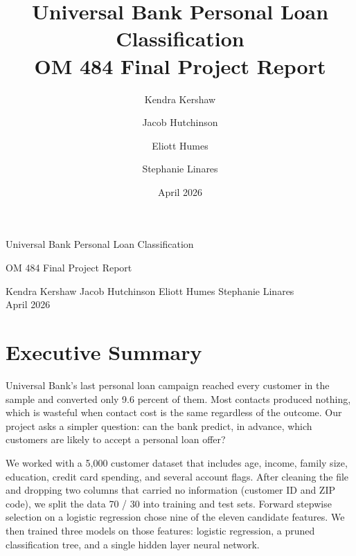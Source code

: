 \documentclass[11pt, a4paper]{article}
\title{Universal Bank Personal Loan Classification\\[0.3em]
       \large OM 484 Final Project Report}
\author{Kendra Kershaw \and Jacob Hutchinson \and Eliott Humes \and Stephanie Linares}
\date{April 2026}
\begin{document}
\begin{titlepage}
\thispagestyle{empty}

\vspace*{2in}

\noindent
{\fontsize{28}{34}\selectfont\color{gdarkgrey}\textsf{Universal Bank Personal Loan Classification}}

\vspace{0.4in}

\noindent
{}

\vspace{0.4in}

\noindent
{\fontsize{13}{16}\selectfont\color{ggrey}\textsf{OM 484 Final Project Report}}

\vfill

\noindent
{\color{gdarkgrey}\textsf{Kendra Kershaw \quad Jacob Hutchinson \quad Eliott Humes \quad Stephanie Linares}}\\[0.15in]
{\color{ggrey}\textsf{April 2026}}

\end{titlepage}

\thispagestyle{empty}
\begingroup
  \renewcommand{\contentsname}{\textsf{\textbf{\color{gdarkgrey}Contents}}}
  \tableofcontents
\endgroup
\clearpage

\setcounter{page}{1}
\thispagestyle{fancy}

\section*{Executive Summary}

Universal Bank's last personal loan campaign reached every customer in the
sample and converted only 9.6 percent of them. Most contacts produced
nothing, which is wasteful when contact cost is the same regardless of the
outcome. Our project asks a simpler question: can the bank predict, in
advance, which customers are likely to accept a personal loan offer?

We worked with a 5{,}000 customer dataset that includes age, income, family
size, education, credit card spending, and several account flags. After
cleaning the file and dropping two columns that carried no information
(customer ID and ZIP code), we split the data 70 / 30 into training and test
sets. Forward stepwise selection on a logistic regression chose nine of
the eleven candidate features. We then trained three models on those
features: logistic regression, a pruned classification tree, and a single
hidden layer neural network.
\end{document}

